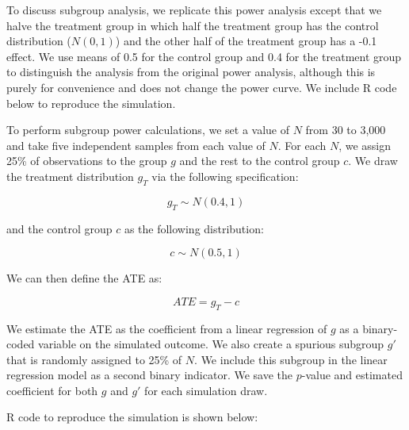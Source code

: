 \documentclass[12pt, letterpaper]{article}
\begin{document}
To discuss subgroup analysis, we replicate this power analysis except that we halve the treatment group in which half the treatment group has the control distribution ($N(0,1)$) and the other half of the treatment group has a -0.1 effect. We use means of 0.5 for the control group and 0.4 for the treatment group to distinguish the analysis from the original power analysis, although this is purely for convenience and does not change the power curve. We include R code below to reproduce the simulation.

To perform subgroup power calculations, we set a value of $N$ from 30 to 3,000 and take five independent samples from each value of $N$. For each $N$, we assign 25\% of observations to the group $g$ and the rest to the control group $c$. We draw the treatment distribution $g_T$ via the following specification:

$$
g_T \sim N(0.4, 1)
$$

and the control group $c$ as the following distribution:

$$
c \sim N(0.5,1)
$$

We can then define the ATE as:

$$
ATE = g_T - c
$$

We estimate the ATE as the coefficient from a linear regression of $g$ as a binary-coded variable on the simulated outcome. We also create a spurious subgroup $g'$ that is randomly assigned to 25\% of $N$. We include this subgroup in the linear regression model as a second binary indicator. We save the $p$-value and estimated coefficient for both $g$ and $g'$ for each simulation draw.

R code to reproduce the simulation is shown below:
\end{document}
